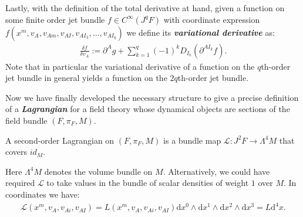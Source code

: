 Lastly, with the definition of the total derivative at hand, given a function on some finite order jet bundle $f \in C^{\infty}(J^qF)$ with coordinate expression $f(x^m,v_A,v_{Am},v_{AI},v_{AI_{3}},...,v_{AI_{q}})$ we define its \textit{\textbf{variational derivative}} as: 
\begin{align}\label{varDer}
\frac{\delta f}{\delta v_A} := \partial^{A}g + \sum _{k = 1}^q (-1)^k D_{I_k}(\partial^{AI_k}f).
\end{align}
Note that in particular the variational derivative of a function on the $q$th-order jet bundle in general yields a function on the $2q$th-order jet bundle.

Now we have finally developed the necessary structure to give a precise definition of a \textbf{\textit{Lagrangian}} for a field theory whose dynamical objects are sections of the field bundle $(F, \pi_F,M)$.
\begin{definition}[Lagrangian]
A second-order Lagrangian on $(F,\pi_F,M)$ is a bundle map $\mathcal{L} : J^2F \rightarrow \Lambda^4M$ that covers $id_M$.
\end{definition}
Here $\Lambda^4 M$ denotes the volume bundle on $M$. Alternatively, we could have required $\mathcal{L}$ to take values in the bundle of scalar densities of weight $1$ over $M$. In coordinates we have: 
\begin{align}
    \mathcal{L}(x^m,v_A,v_{Ai},v_{AI}) = L(x^m,v_A,v_{Ai},v_{AI}) \mathrm{d}x^0 \wedge \mathrm{d}x^1 \wedge \mathrm{d}x^2 \wedge \mathrm{d}x^3 = L \mathrm{d}^4x.
\end{align} 

